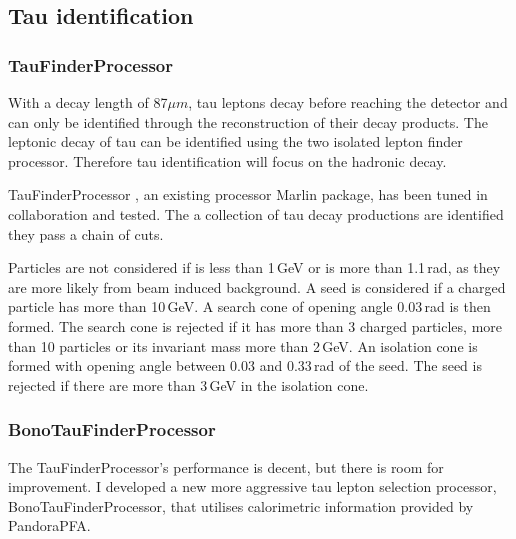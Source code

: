 \subsection{Tau identification}

\subsubsection{TauFinderProcessor}

With a decay length of 87$\mu{m}$, tau leptons decay before reaching the detector and can only be identified through the reconstruction of their decay products. The leptonic decay of tau can be identified using the two isolated lepton finder processor. Therefore tau identification will focus on the hadronic decay.

TauFinderProcessor \cite{LCD-Note-2010-009}, an existing processor Marlin package, has been tuned in collaboration and tested. The a collection of tau decay productions are identified they pass a chain of cuts.

Particles are not considered if \pT is less than 1\,GeV or \absCosTheta is more than 1.1\,rad, as they are more likely from beam induced background. A seed is considered if a charged particle has \pT more than 10\,GeV. A search cone of opening angle 0.03\,rad is then formed. The search cone is rejected if it has more than 3 charged particles, more than 10 particles or its invariant mass more than 2\,GeV. An isolation cone is formed with opening angle between 0.03 and 0.33\,rad of the seed. The seed is rejected if there are more than 3\,GeV in the isolation cone.

\subsubsection{BonoTauFinderProcessor}

The TauFinderProcessor's performance is decent, but there is room for improvement. I developed a new more aggressive tau lepton selection processor, BonoTauFinderProcessor, that utilises calorimetric information provided by PandoraPFA.

